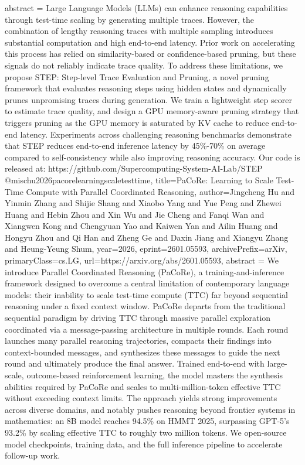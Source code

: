 {      abstract = {Large Language Models (LLMs) can enhance reasoning capabilities through test-time scaling by generating multiple traces. However, the combination of lengthy reasoning traces with multiple sampling introduces substantial computation and high end-to-end latency. Prior work on accelerating this process has relied on similarity-based or confidence-based pruning, but these signals do not reliably indicate trace quality. To address these limitations, we propose STEP: Step-level Trace Evaluation and Pruning, a novel pruning framework that evaluates reasoning steps using hidden states and dynamically prunes unpromising traces during generation. We train a lightweight step scorer to estimate trace quality, and design a GPU memory-aware pruning strategy that triggers pruning as the GPU memory is saturated by KV cache to reduce end-to-end latency. Experiments across challenging reasoning benchmarks demonstrate that STEP reduces end-to-end inference latency by 45\%-70\% on average compared to self-consistency while also improving reasoning accuracy. Our code is released at: https://github.com/Supercomputing-System-AI-Lab/STEP}
}@misc{hu2026pacorelearningscaletesttime,
      title={PaCoRe: Learning to Scale Test-Time Compute with Parallel Coordinated Reasoning}, 
      author={Jingcheng Hu and Yinmin Zhang and Shijie Shang and Xiaobo Yang and Yue Peng and Zhewei Huang and Hebin Zhou and Xin Wu and Jie Cheng and Fanqi Wan and Xiangwen Kong and Chengyuan Yao and Kaiwen Yan and Ailin Huang and Hongyu Zhou and Qi Han and Zheng Ge and Daxin Jiang and Xiangyu Zhang and Heung-Yeung Shum},
      year={2026},
      eprint={2601.05593},
      archivePrefix={arXiv},
      primaryClass={cs.LG},
      url={https://arxiv.org/abs/2601.05593},
      abstract = {We introduce Parallel Coordinated Reasoning (PaCoRe), a training-and-inference framework designed to overcome a central limitation of contemporary language models: their inability to scale test-time compute (TTC) far beyond sequential reasoning under a fixed context window. PaCoRe departs from the traditional sequential paradigm by driving TTC through massive parallel exploration coordinated via a message-passing architecture in multiple rounds. Each round launches many parallel reasoning trajectories, compacts their findings into context-bounded messages, and synthesizes these messages to guide the next round and ultimately produce the final answer. Trained end-to-end with large-scale, outcome-based reinforcement learning, the model masters the synthesis abilities required by PaCoRe and scales to multi-million-token effective TTC without exceeding context limits. The approach yields strong improvements across diverse domains, and notably pushes reasoning beyond frontier systems in mathematics: an 8B model reaches 94.5\% on HMMT 2025, surpassing GPT-5's 93.2\% by scaling effective TTC to roughly two million tokens. We open-source model checkpoints, training data, and the full inference pipeline to accelerate follow-up work.}
}
